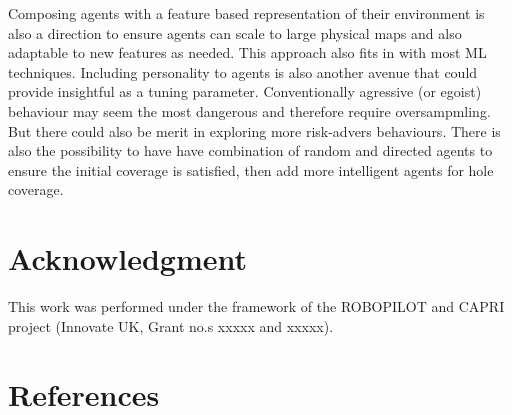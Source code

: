 \documentclass[letterpaper, 10 pt, journal, twoside]{IEEEtran}
\begin{document}
Composing agents with a feature based representation of their environment is also a direction to ensure agents can scale to large physical maps and also adaptable to new features as needed. This approach also fits in with most ML techniques.
%
Including personality to agents is also another avenue that could provide insightful as a tuning parameter. Conventionally agressive (or egoist) behaviour may seem the most dangerous and therefore require oversampmling. But there could also be merit in exploring more risk-advers behaviours. 
%
There is also the possibility to have have combination of random and directed agents to ensure the initial coverage is satisfied, then add more intelligent agents for hole coverage.

\section*{Acknowledgment}
This work was performed under the framework of the ROBOPILOT and CAPRI project
(Innovate UK, Grant no.s xxxxx and xxxxx). 


\balance
\section*{References}
\printbibliography[heading=none]
\end{document}
